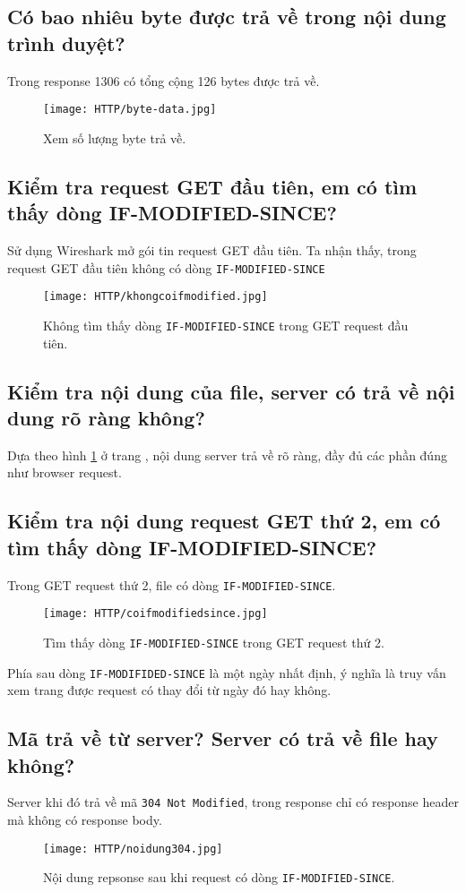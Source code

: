 \documentclass[]{article}
\begin{document}
\subsection{Có bao nhiêu byte được trả về trong nội dung trình duyệt?}
Trong response 1306 có tổng cộng 126 bytes được trả về.
\begin{figure}[H]
\centering
\texttt{[image: HTTP/byte-data.jpg]}
\caption{Xem số lượng byte trả về.}
\end{figure}

\subsection{Kiểm tra request GET đầu tiên, em có tìm thấy dòng IF-MODIFIED-SINCE?}
Sử dụng Wireshark mở gói tin request GET đầu tiên. Ta nhận thấy, trong request GET đầu tiên không có dòng \texttt{IF-MODIFIED-SINCE}
\begin{figure}[H]
\centering
\texttt{[image: HTTP/khongcoifmodified.jpg]}
\caption{Không tìm thấy dòng \texttt{IF-MODIFIED-SINCE} trong GET request đầu tiên.}
\label{fig:khongmodified}
\end{figure}

\subsection{Kiểm tra nội dung của file, server có trả về nội dung rõ ràng không?}
Dựa theo hình \ref{fig:khongmodified} ở trang \pageref{fig:khongmodified}, nội dung server trả về rõ ràng, đầy đủ các phần đúng như browser request.

\subsection{Kiểm tra nội dung request GET thứ 2, em có tìm thấy dòng IF-MODIFIED-SINCE?}
Trong GET request thứ 2, file có dòng \texttt{IF-MODIFIED-SINCE}.
\begin{figure}[H]
\centering
\texttt{[image: HTTP/coifmodifiedsince.jpg]}
\caption{Tìm thấy dòng \texttt{IF-MODIFIED-SINCE} trong GET request thứ 2.}
\end{figure}
Phía sau dòng \texttt{IF-MODIFIDED-SINCE} là một ngày nhất định, ý nghĩa là truy vấn xem trang được request có thay đổi từ ngày đó hay không.

\subsection{Mã trả về từ server? Server có trả về file hay không?}
Server khi đó trả về mã \texttt{304 Not Modified}\cite{MSDN-304}, trong response chỉ có response header mà không có response body.
\begin{figure}[H]
\centering
\texttt{[image: HTTP/noidung304.jpg]}
\caption{Nội dung repsonse sau khi request có dòng \texttt{IF-MODIFIED-SINCE}.}
\end{figure}
\end{document}
